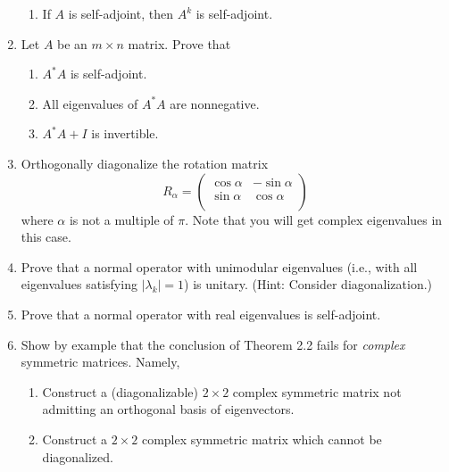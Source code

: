\documentclass[../psets.tex]{subfiles}
\begin{document}
\begin{enumerate}[label={\textbf{2.\arabic*.}}]
\begin{enumerate}
        \item If $A$ is self-adjoint, then $A^k$ is self-adjoint.
    \end{enumerate}
    \item Let $A$ be an $m\times n$ matrix. Prove that
    \begin{enumerate}
        \item $A^*A$ is self-adjoint.
        \item All eigenvalues of $A^*A$ are nonnegative.
        \item $A^*A+I$ is invertible.
    \end{enumerate}
    \item Orthogonally diagonalize the rotation matrix
    \begin{equation*}
        R_\alpha =
        \begin{pmatrix}
            \cos\alpha & -\sin\alpha\\
            \sin\alpha & \cos\alpha\\
        \end{pmatrix}
    \end{equation*}
    where $\alpha$ is not a multiple of $\pi$. Note that you will get complex eigenvalues in this case.
    \setcounter{enumi}{12}
    \item Prove that a normal operator with unimodular eigenvalues (i.e., with all eigenvalues satisfying $|\lambda_k|=1$) is unitary. (Hint: Consider diagonalization.)
    \item Prove that a normal operator with real eigenvalues is self-adjoint.
    \item Show by example that the conclusion of Theorem 2.2 fails for \emph{complex} symmetric matrices. Namely,
    \begin{enumerate}
        \item Construct a (diagonalizable) $2\times 2$ complex symmetric matrix not admitting an orthogonal basis of eigenvectors.
        \item Construct a $2\times 2$ complex symmetric matrix which cannot be diagonalized.
    \end{enumerate}
\end{enumerate}
\end{document}
